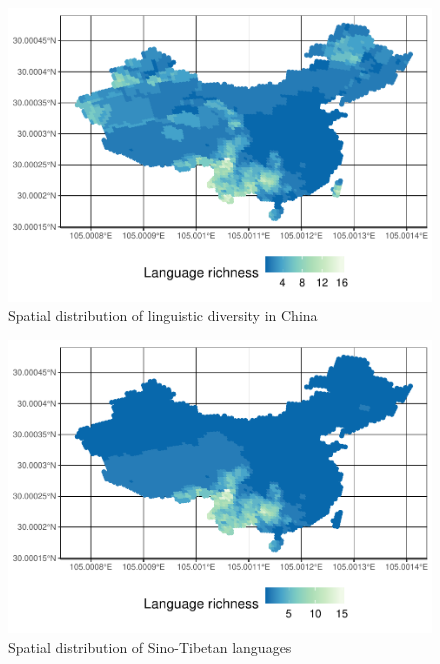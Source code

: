 \documentclass[12pt,]{article}
\begin{document}
\begin{figure}
\centering
\includegraphics{Project_Template_files/figure-latex/unnamed-chunk-6-1.pdf}
\caption{Spatial distribution of linguistic diversity in China}
\end{figure}

\begin{figure}
\centering
\includegraphics{Project_Template_files/figure-latex/unnamed-chunk-7-1.pdf}
\caption{Spatial distribution of Sino-Tibetan languages}
\end{figure}
\end{document}
